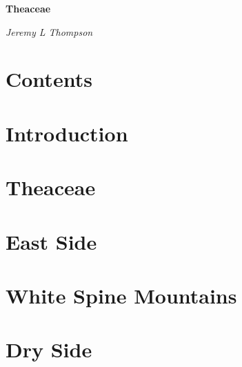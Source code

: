 \documentclass[oneside]{book}
\begin{document}
\begin{titlepage}
\centering

{\Huge\bfseries\color{firebrick} Theaceae\par}
\vspace{2cm}
{\large\itshape Jeremy L Thompson}

\end{titlepage}

\chapter*{Contents}

\begin{multicols}{2}
\makeatletter
\large{
}
\makeatother
\end{multicols}

\chapter*{Introduction}



\chapter{Theaceae}



\chapter{East Side}



\chapter{White Spine Mountains}



\chapter{Dry Side}


\end{document}
